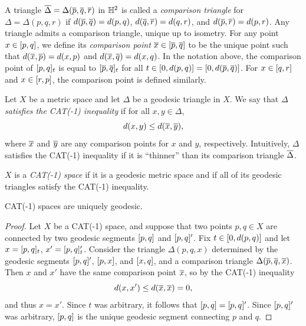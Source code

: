 A triangle $\overline{\Delta} = \Delta(\overline p,\overline q,\overline r)$ in $\H^2$ is called a \emph{comparison triangle} for $\Delta = \Delta(p,q,r)$ if $d(\overline p, \overline q) = d(p,q)$, $d(\overline q,\overline r) = d(q, r)$, and $d(\overline p,\overline r) = d(p,r)$. Any triangle admits a comparison triangle, unique up to isometry. For any point $x\in[p,q]$, we define its \emph{comparison point} $\overline x\in[\overline p,\overline q]$ to be the unique point such that $d(\overline x,\overline p) = d(x,p)$ and $d(\overline x,\overline q) = d(x,q)$. In the notation above, the comparison point of $[p,q]_t$ is equal to $[\overline p,\overline q]_t$ for all $t\in[0,d(p,q)] = [0,d(\overline p,\overline q)]$. For $x\in [q,r]$ and $x\in [r,p]$, the comparison point is defined similarly.

Let $X$ be a metric space and let $\Delta$ be a geodesic triangle in $X$. We say that $\Delta$ \emph{satisfies the CAT(-1) inequality} if for all $x,y\in\Delta$,
\begin{equation}
\label{CAT}
d(x, y) \leq d(\overline x, \overline y),
\end{equation}
where $\overline x$ and $\overline y$ are any comparison points for $x$ and $y$, respectively. Intuitively, $\Delta$ satisfies the CAT(-1) inequality if it is ``thinner'' than its comparison triangle $\overline{\Delta}$.

\begin{definition}
\label{definitionCAT}
$X$ is a \emph{CAT(-1) space} if it is a geodesic metric space and if all of its geodesic triangles satisfy the CAT(-1) inequality.
\end{definition}
\begin{observation}
\label{observationCATuniquelygeo}
CAT(-1) spaces are uniquely geodesic.
\end{observation}
\begin{proof}
Let $X$ be a CAT(-1) space, and suppose that two points $p,q\in X$ are connected by two geodesic segments $[p,q]$ and $[p,q]'$. Fix $t\in [0,d(p,q)]$ and let $x = [p,q]_t$, $x' = [p,q]_t'$. Consider the triangle $\Delta(p,q,x)$ determined by the geodesic segments $[p,q]'$, $[p,x]$, and $[x,q]$, and a comparison triangle $\Delta(\overline p,\overline q,\overline x)$. Then $x$ and $x'$ have the same comparison point $\overline x$, so by the CAT(-1) inequality
\[
d(x,x')\leq d(\overline x,\overline x) = 0,
\]
and thus $x = x'$. Since $t$ was arbitrary, it follows that $[p,q] = [p,q]'$. Since $[p,q]'$ was arbitrary, $[p,q]$ is the unique geodesic segment connecting $p$ and $q$.
\end{proof}

